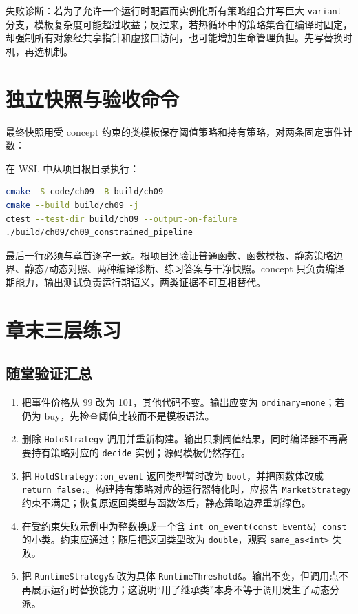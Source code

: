 失败诊断：若为了允许一个运行时配置而实例化所有策略组合并写巨大 \texttt{variant} 分支，模板复杂度可能超过收益；反过来，若热循环中的策略集合在编译时固定，却强制所有对象经共享指针和虚接口访问，也可能增加生命管理负担。先写替换时机，再选机制。

\section{独立快照与验收命令}

最终快照用受 concept 约束的类模板保存阈值策略和持有策略，对两条固定事件计数：



在 WSL 中从项目根目录执行：

\begin{lstlisting}[language=bash]
cmake -S code/ch09 -B build/ch09
cmake --build build/ch09 -j
ctest --test-dir build/ch09 --output-on-failure
./build/ch09/ch09_constrained_pipeline
\end{lstlisting}

最后一行必须与章首逐字一致。根项目还验证普通函数、函数模板、静态策略边界、静态/动态对照、两种编译诊断、练习答案与干净快照。concept 只负责编译期能力，输出测试负责运行期语义，两类证据不可互相替代。

\section{章末三层练习}

\subsection*{随堂验证汇总}

\begin{enumerate}
  \item 把事件价格从 99 改为 101，其他代码不变。输出应变为 \texttt{ordinary=none}；若仍为 buy，先检查阈值比较而不是模板语法。
  \item 删除 \texttt{HoldStrategy} 调用并重新构建。输出只剩阈值结果，同时编译器不再需要持有策略对应的 \texttt{decide} 实例；源码模板仍然存在。
  \item 把 \texttt{HoldStrategy::on\_event} 返回类型暂时改为 \texttt{bool}，并把函数体改成 \texttt{return false;}。构建持有策略对应的运行器特化时，应报告 \texttt{MarketStrategy} 约束不满足；恢复原返回类型与函数体后，静态策略边界重新绿色。
  \item 在受约束失败示例中为整数换成一个含 \texttt{int on\_event(const Event\&) const} 的小类。约束应通过；随后把返回类型改为 \texttt{double}，观察 \texttt{same\_as<int>} 失败。
  \item 把 \texttt{RuntimeStrategy\&} 改为具体 \texttt{RuntimeThreshold\&}。输出不变，但调用点不再展示运行时替换能力；这说明“用了继承类”本身不等于调用发生了动态分派。
\end{enumerate}

